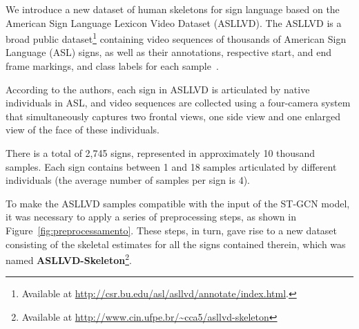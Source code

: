 We introduce a new dataset of human skeletons for sign language based on the American Sign Language Lexicon Video Dataset (ASLLVD). The ASLLVD  is a broad public dataset\footnote{ Available at \url{http://csr.bu.edu/asl/asllvd/annotate/index.html}.} containing video sequences of thousands of American Sign Language (ASL) signs, as well as their annotations, respective start, and end frame markings, and class labels for each sample~\cite{athitsos-asllvd-2008,neidle-2012}.

According to the authors, each sign in ASLLVD is articulated by native individuals in ASL, and video sequences are collected using a four-camera system that simultaneously captures two frontal views, one side view and one enlarged view of the face of these individuals. %

    

There is a total of 2,745 signs, represented in approximately 10 thousand samples. Each sign contains between 1 and 18 samples articulated by different individuals (the average number of samples per sign is 4).


To make the ASLLVD samples compatible with the input of the ST-GCN model, it was necessary to apply a series of preprocessing steps, as shown in Figure~\ref{fig:preprocessamento}. These steps, in turn, gave rise to a new dataset consisting of the skeletal estimates for all the signs contained therein, which was named \textbf{ASLLVD-Skeleton}\footnote{
   Available at \url{http://www.cin.ufpe.br/~cca5/asllvd-skeleton}}. \\[-8mm]

